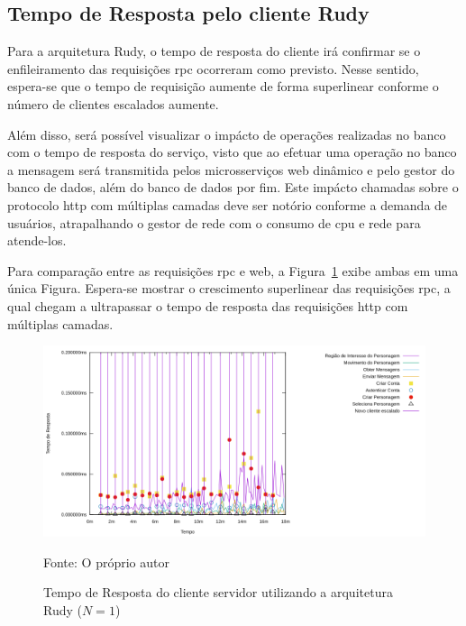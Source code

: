 \subsection{Tempo de Resposta pelo cliente Rudy}

Para a arquitetura Rudy, o tempo de resposta do cliente irá confirmar se o enfileiramento das requisições \ac{rpc} ocorreram como previsto.
%
Nesse sentido, espera-se que o tempo de requisição aumente de forma superlinear conforme o número de clientes escalados aumente.


Além disso, será possível visualizar o impácto de operações realizadas no banco com o tempo de resposta do serviço, visto que ao efetuar uma operação no banco a mensagem será transmitida pelos microsserviços web dinâmico e pelo gestor do banco de dados, além do banco de dados por fim.
%
Este impácto chamadas sobre o protocolo \ac{http} com múltiplas camadas deve ser notório conforme a demanda de usuários, atrapalhando o gestor de rede com o consumo de \ac{cpu} e rede para atende-los.

Para comparação entre as requisições \ac{rpc} e web, a Figura~\ref{fig:rudy_t4_reqs} exibe ambas em uma única Figura.
%
Espera-se mostrar o crescimento superlinear das requisições \ac{rpc}, a qual chegam a ultrapassar o tempo de resposta das requisições \ac{http} com múltiplas camadas.

\begin{figure}[htb!]
    \caption{Tempo de Resposta do cliente servidor utilizando a arquitetura Rudy ($N=1$)}
    \label{fig:rudy_t4_reqs}
    \includegraphics[width=\textwidth]{metricas_rudy_t4/rudyc.png}
    \centering
    
    Fonte: O próprio autor
\end{figure}


